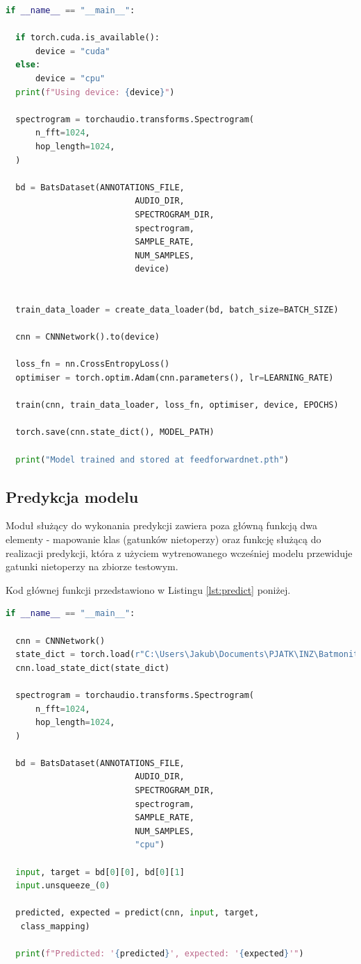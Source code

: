 \documentclass{sprz}
\begin{document}
\begin{lstlisting}[language=Python,caption={Implementacja modułu do trenowania sieci}, label={lst:train}]
  if __name__ == "__main__":

  if torch.cuda.is_available():
      device = "cuda"
  else:
      device = "cpu"
  print(f"Using device: {device}")

  spectrogram = torchaudio.transforms.Spectrogram(
      n_fft=1024,
      hop_length=1024,
  )

  bd = BatsDataset(ANNOTATIONS_FILE,
                          AUDIO_DIR,
                          SPECTROGRAM_DIR, 
                          spectrogram, 
                          SAMPLE_RATE,
                          NUM_SAMPLES,
                          device)


  train_data_loader = create_data_loader(bd, batch_size=BATCH_SIZE)

  cnn = CNNNetwork().to(device)

  loss_fn = nn.CrossEntropyLoss()
  optimiser = torch.optim.Adam(cnn.parameters(), lr=LEARNING_RATE)

  train(cnn, train_data_loader, loss_fn, optimiser, device, EPOCHS)

  torch.save(cnn.state_dict(), MODEL_PATH)

  print("Model trained and stored at feedforwardnet.pth")
\end{lstlisting}

\subsection{Predykcja modelu}
Moduł służący do wykonania predykcji zawiera poza główną funkcją dwa elementy - mapowanie klas (gatunków nietoperzy) oraz funkcję służącą do realizacji predykcji, która z użyciem wytrenowanego wcześniej modelu przewiduje gatunki nietoperzy na zbiorze testowym.

Kod głównej funkcji przedstawiono w Listingu \ref{lst:predict} poniżej.

\begin{lstlisting}[language=Python,caption={Implementacja modułu do trenowania sieci}, label={lst:predict}]
  if __name__ == "__main__":

  cnn = CNNNetwork()
  state_dict = torch.load(r"C:\Users\Jakub\Documents\PJATK\INZ\Batmonit_model\feedforwardnet.pth", map_location=torch.device('cpu'))
  cnn.load_state_dict(state_dict)

  spectrogram = torchaudio.transforms.Spectrogram(
      n_fft=1024,
      hop_length=1024,
  )

  bd = BatsDataset(ANNOTATIONS_FILE,
                          AUDIO_DIR,
                          SPECTROGRAM_DIR, 
                          spectrogram, 
                          SAMPLE_RATE,
                          NUM_SAMPLES,
                          "cpu")

  input, target = bd[0][0], bd[0][1]
  input.unsqueeze_(0)

  predicted, expected = predict(cnn, input, target,
   class_mapping)

  print(f"Predicted: '{predicted}', expected: '{expected}'")
\end{lstlisting}
\end{document}
